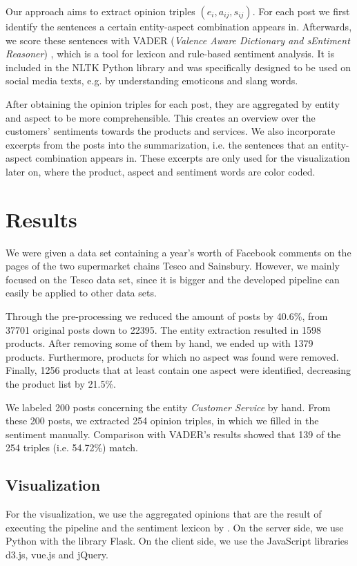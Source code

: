 \documentclass[10pt,a4paper]{article}
\begin{document}
		Our approach aims to extract opinion triples $(e_{i}, a_{ij}, s_{ij})$. For each post we first identify the sentences a certain entity-aspect combination appears in. Afterwards, we score these sentences with VADER (\textit{Valence Aware Dictionary and sEntiment Reasoner}) \cite{vader}, which is a tool for lexicon and rule-based sentiment analysis. It is included in the NLTK Python library and was specifically designed to be used on social media texts, e.g. by understanding emoticons and slang words.

		After obtaining the opinion triples for each post, they are aggregated by entity and aspect to be more comprehensible. This creates an overview over the customers' sentiments towards the products and services. We also incorporate excerpts from the posts into the summarization, i.e. the sentences that an entity-aspect combination appears in. These excerpts are only used for the visualization later on, where the product, aspect and sentiment words are color coded.
		
	\section{Results}
	\label{sec:results}
	We were given a data set containing a year's worth of Facebook comments on the pages of the two supermarket chains Tesco and Sainsbury. However, we mainly focused on the Tesco data set, since it is bigger and the developed pipeline can easily be applied to other data sets.
	
	Through the pre-processing we reduced the amount of posts by 40.6\%, from 37701 original posts down to 22395. The entity extraction resulted in 1598 products. After removing some of them by hand, we ended up with 1379 products. Furthermore, products for which no aspect was found were removed. Finally, 1256 products that at least contain one aspect were identified, decreasing the product list by 21.5\%. 

	We labeled 200 posts concerning the entity \textit{Customer Service} by hand. From these 200 posts, we extracted 254 opinion triples, in which we filled in the sentiment manually. Comparison with VADER's results showed that 139 of the 254 triples (i.e. 54.72\%) match.

		\subsection{Visualization}
		For the visualization, we use the aggregated opinions that are the result of executing the pipeline and the sentiment lexicon by \cite{Hu:2004:MSC:1014052.1014073}. On the server side, we use Python with the library Flask. On the client side, we use the JavaScript libraries d3.js, vue.js and jQuery.
		
\end{document}
